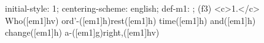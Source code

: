 initial-style: 1;
centering-scheme: english;
def-m1: \grealign;
(f3) <c>1.</c> Who([em1]hv) ord'-([em1]h)rest([em1]h) time([em1]h) and([em1]h) change([em1]h) a-([em1]g)right,([em1]hv)